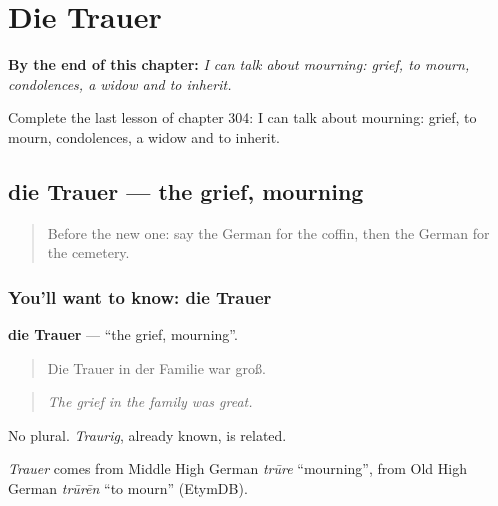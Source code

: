 
\chapter{Die Trauer}
\label{ch:ge-die-trauer}

\begin{chapteropening}
\textbf{By the end of this chapter:} \emph{I can talk about mourning: grief, to mourn, condolences, a widow and to inherit.}

Complete the last lesson of chapter 304: I can talk about mourning: grief, to mourn, condolences, a widow and to inherit.
\end{chapteropening}

\section[die Trauer]{die Trauer — the grief, mourning}

\label{lesson:GE-C304-trauer}



\begin{quote}
Before the new one: say the German for the coffin, then the German for the cemetery.
\end{quote}

\subsection*{You'll want to know: die Trauer}
\textbf{die Trauer} — \textquotedblleft{}the grief, mourning\textquotedblright{}.

\begin{quote}
Die Trauer in der Familie war groß.
\end{quote}

\begin{quote}
\emph{The grief in the family was great.}
\end{quote}

No plural. \emph{Traurig}, already known, is related.

\begin{cousinweb}
\emph{Trauer} comes from Middle High German \emph{trūre} \textquotedblleft{}mourning\textquotedblright{}, from Old High German \emph{trūrēn} \textquotedblleft{}to mourn\textquotedblright{} (EtymDB).
\end{cousinweb}

